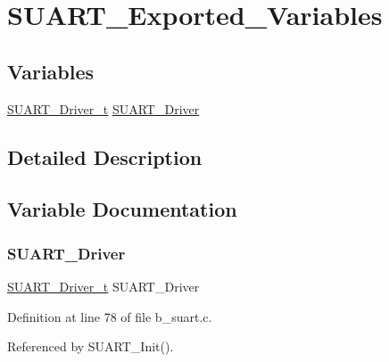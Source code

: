 \hypertarget{group___s_u_a_r_t___exported___variables}{}\section{S\+U\+A\+R\+T\+\_\+\+Exported\+\_\+\+Variables}
\label{group___s_u_a_r_t___exported___variables}
\subsection*{Variables}
\begin{DoxyCompactItemize}
\item 
\mbox{\hyperlink{group___s_u_a_r_t___exported___types_definitions_ga76678b78633641a143ec958271e0bc05}{S\+U\+A\+R\+T\+\_\+\+Driver\+\_\+t}} \mbox{\hyperlink{group___s_u_a_r_t___exported___variables_ga2653dcd74de96e06405a5207f6f53f3e}{S\+U\+A\+R\+T\+\_\+\+Driver}}
\end{DoxyCompactItemize}


\subsection{Detailed Description}


\subsection{Variable Documentation}
\mbox{\label{group___s_u_a_r_t___exported___variables_ga2653dcd74de96e06405a5207f6f53f3e}} 
\subsubsection{\texorpdfstring{S\+U\+A\+R\+T\+\_\+\+Driver}{SUART\_Driver}}
{\footnotesize\ttfamily \mbox{\hyperlink{group___s_u_a_r_t___exported___types_definitions_ga76678b78633641a143ec958271e0bc05}{S\+U\+A\+R\+T\+\_\+\+Driver\+\_\+t}} S\+U\+A\+R\+T\+\_\+\+Driver}



Definition at line 78 of file b\+\_\+suart.\+c.



Referenced by S\+U\+A\+R\+T\+\_\+\+Init().

